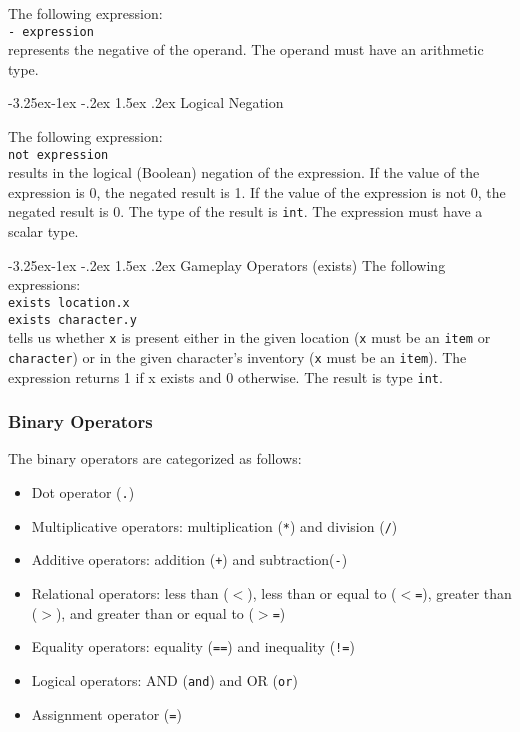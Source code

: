\documentclass[12pt]{article}
\makeatletter
\renewcommand\paragraph{\@startsection{paragraph}{4}{\z@}%
  {-3.25ex\@plus -1ex \@minus -.2ex}%
  {1.5ex \@plus .2ex}%
  {\normalfont\normalsize\bfseries}}
\makeatother
\begin{document}
The following expression: \\

\texttt{- expression} \\

\noindent represents the negative of the operand.  The operand must have an arithmetic type.

\paragraph{Logical Negation}

The following expression: \\

\texttt{not expression} \\

\noindent results in the logical (Boolean) negation of the expression.  If the value of the expression is 0, the negated result is 1.  If the value of the expression is not 0, the negated result is 0.  The type of the result is \texttt{int}.  The expression must have a scalar type.

\paragraph{Gameplay Operators (exists)}
The following expressions: \\

\texttt{exists location.x} \\
\indent \texttt{exists character.y} \\

\noindent tells us whether \texttt{x} is present either in the given location (\texttt{x} must be an \texttt{item} or \texttt{character}) or in the given character's inventory (\texttt{x} must be an \texttt{item}).  The expression returns 1 if x exists and 0 otherwise.  The result is type \texttt{int}.

\subsubsection{Binary Operators}
The binary operators are categorized as follows:
\begin{itemize}
\item Dot operator (\texttt{.})
\item Multiplicative operators: multiplication (\texttt{*}) and division (\texttt{/})
\item Additive operators: addition (\texttt{+}) and subtraction(\texttt{-})
\item Relational operators: less than (\texttt{$<$}), less than or equal to (\texttt{$<$=}), greater than (\texttt{$>$}), and greater than or equal to (\texttt{$>$=})
\item Equality operators: equality (\texttt{==}) and inequality (\texttt{!=})
\item Logical operators: AND (\texttt{and}) and OR (\texttt{or})
\item Assignment operator (\texttt{=}) 
\end{itemize}
\end{document}
